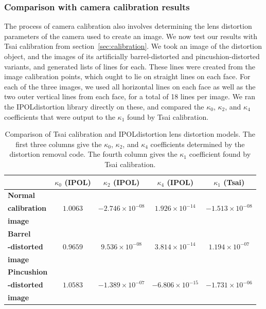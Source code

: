 \subsubsection{Comparison with camera calibration results}

The process of camera calibration also involves determining the lens distortion parameters of the camera used to create an image. We now test our results with Tsai calibration from section~\ref{sec:calibration}. We took an image of the distortion object, and the images of its artificially barrel-distorted and pincushion-distorted variants, and generated lists of lines for each. These lines were created from the image calibration points, which ought to lie on straight lines on each face. For each of the three images, we used all horizontal lines on each face as well as the two outer vertical lines from each face, for a total of 18 lines per image. We ran the IPOLdistortion library directly on these, and compared the $\kappa_{0}$, $\kappa_{2}$, and $\kappa_{4}$ coefficients that were output to the $\kappa_{1}$ found by Tsai calibration.

\begin{table}[htb]
  \centering
  \begin{tabular}{| l | c c c | c |}
    \hline
    {\textbf{ }} &
    {\textbf{$\kappa_{0}$ (IPOL)}} &
    {\textbf{$\kappa_{2}$ (IPOL)}} &
    {\textbf{$\kappa_{4}$ (IPOL)}} &
    {\textbf{$\kappa_{1}$ (Tsai)}}\\
    \hline
    {\textbf{Normal}} & { } & { } & { } & { } \\
    {\textbf{calibration}} & {$1.0063$} & {$-2.746 \times 10^{-08}$} & {$1.926 \times 10^{-14}$} & {$-1.513 \times 10^{-08}$} \\
    {\textbf{image}} & { } & { } & { } & { } \\
    \hline
    {\textbf{Barrel}} & { } & { } & { } & { } \\
    {\textbf{-distorted}} & {$0.9659$} & {$9.536 \times 10^{-08}$} & {$3.814 \times 10^{-14}$} & {$1.194 \times 10^{-07}$} \\
    {\textbf{image}} & { } & { } & { } & { } \\
    \hline
    {\textbf{Pincushion}} & { } & { } & { } & { } \\
    {\textbf{-distorted}} & {$1.0583$} & {$-1.389 \times 10^{-07}$} & {$-6.806 \times 10^{-15}$} & {$-1.731 \times 10^{-06}$} \\
    {\textbf{image}} & { } & { } & { } & { } \\
    \hline
  \end{tabular}
  \caption[Comparison of Tsai calibration and IPOLdistortion lens distortion models]{Comparison of Tsai calibration and IPOLdistortion lens distortion models. The first three columns give the $\kappa_{0}$, $\kappa_{2}$, and $\kappa_{4}$ coefficients determined by the distortion removal code. The fourth column gives the $\kappa_{1}$ coefficient found by Tsai calibration.}
  \label{tbl:calib-distort-compare}
\end{table}

